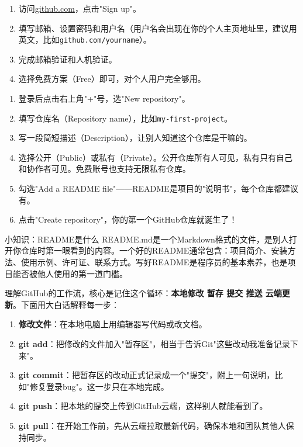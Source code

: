 

\begin{enumerate}
  \item 访问\href{https://github.com}{github.com}，点击"Sign up"。
  \item 填写邮箱、设置密码和用户名（用户名会出现在你的个人主页地址里，建议用英文，比如\texttt{github.\allowbreak com/\allowbreak yourname}）。
  \item 完成邮箱验证和人机验证。
  \item 选择免费方案（Free）即可，对个人用户完全够用。
\end{enumerate}


\begin{enumerate}
  \item 登录后点击右上角"+"号，选"New repository"。
  \item 填写仓库名（Repository name），比如\texttt{my-\allowbreak first-\allowbreak project}。
  \item 写一段简短描述（Description），让别人知道这个仓库是干嘛的。
  \item 选择公开（Public）或私有（Private）。公开仓库所有人可见，私有只有自己和协作者可见。免费账号也支持无限私有仓库。
  \item 勾选"Add a README file"——README是项目的"说明书"，每个仓库都建议有。
  \item 点击"Create repository"，你的第一个GitHub仓库就诞生了！
\end{enumerate}

\begin{tcbinfo}{小知识：README是什么}
README.md是一个Markdown格式的文件，是别人打开你仓库时第一眼看到的内容。一个好的README通常包含：项目简介、安装方法、使用示例、许可证、联系方式。写好README是程序员的基本素养，也是项目能否被他人使用的第一道门槛。

\end{tcbinfo}


理解GitHub的工作流，核心是记住这个循环：\textbf{本地修改 暂存 提交 推送 云端更新}。下面用大白话解释每一步：

\begin{enumerate}
  \item \textbf{修改文件}：在本地电脑上用编辑器写代码或改文档。
  \item \textbf{git add}：把修改的文件加入"暂存区"，相当于告诉Git"这些改动我准备记录下来"。
  \item \textbf{git commit}：把暂存区的改动正式记录成一个"提交"，附上一句说明，比如"修复登录bug"。这一步只在本地完成。
  \item \textbf{git push}：把本地的提交上传到GitHub云端，这样别人就能看到了。
  \item \textbf{git pull}：在开始工作前，先从云端拉取最新代码，确保本地和团队其他人保持同步。
\end{enumerate}

